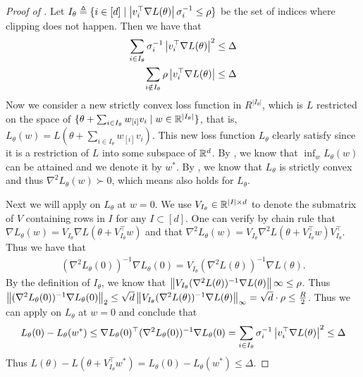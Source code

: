 \begin{proof}[Proof of ]
	Let $I_\theta\triangleq \{i\in[d]\mid \left| v_i^\top \nabla L(\theta) \right|\sigma_i^{-1} \le \rho \}$ be the set of indices where clipping does not happen. Then we have that 
	\begin{align}
		\sum_{i\in I_\theta}  \sigma_i^{-1}\left| v_i^\top \nabla L(\theta) \right|^2\le \Delta\\
		\sum_{i\notin I_\theta}  \rho \left| v_i^\top \nabla L(\theta) \right|\le \Delta
	\end{align}
Now we consider a new strictly convex loss function in $R^{|I_\theta|}$, which is $L$ restricted on the space of $\{\theta + \sum_{i\in I_\theta} w_{[i]}v_i\mid w\in\mathbb{R}^{|I_\theta|}\}$, that is, $ L_\theta(w) = L(\theta+ \sum_{i\in I_\theta}w_{[i]}v_i)$. This new loss function ${L_\theta}$ clearly satisfy  since it is a restriction of $L$ into some subspace of $\mathbb{R}^d$. By  , we know that $\inf_w L_\theta(w)$ can be attained and we denote it by $w^*$. By , we know that $L_\theta$ is strictly convex and thus $\nabla^2 L_\theta(w)\succ 0$, which means  also holds for $L_\theta$. 

Next we will apply  on $L_\theta$ at $w=0$. We  use $V_{I_\theta}\in\mathbb{R}^{|I|\times d}$ to denote the submatrix of $V$ containing rows in $I$ for any $I\subset [d]$. One can verify by chain rule that $\nabla L_\theta(w) = V_{I_\theta} \nabla L(\theta + V_{I_\theta}^\top w)$ and that $\nabla^2 L_\theta(w) = V_{I_\theta} \nabla^2 L(\theta + V_{I_\theta}^\top w) V_{I_\theta}^\top$. Thus we have that 
\begin{align}
(\nabla^2 L_\theta(0)	)^{-1}\nabla L_\theta(0) = V_{I_\theta}(\nabla^2L(\theta))^{-1}\nabla L(\theta).
\end{align}
By the definition of $I_\theta$, we know that $\left\|V_{I_\theta}(\nabla^2L(\theta))^{-1}\nabla L(\theta)\right\|\infty\le \rho$.  Thus $\left\|(\nabla^2 L_\theta(0)	)^{-1}\nabla L_\theta(0)\right\|_2 \le \sqrt{d} \left\|V_{I_\theta}(\nabla^2L(\theta))^{-1}\nabla L(\theta)\right\|_\infty = \sqrt{d}\cdot \rho \le \frac{R}{2}$. Thus we can apply  on $L_\theta$ at $w=0$ and conclude that 
\begin{align}\label{eq:intermediate_loss_approx}
	L_\theta(0)-  L_\theta(w^*) 
	\le \nabla L_\theta(0)^\top (\nabla^2 L_\theta(0))^{-1}\nabla L_\theta(0)
	=  \sum_{i\in I_\theta}  \sigma_i^{-1}\left| v_i^\top \nabla L(\theta) \right|^2
	\le  \Delta 
\end{align}
Thus $L(\theta) - L(\theta+ V_{I_\theta}^\top w^*)   = L_\theta(0)- L_\theta(w^*)\le \Delta $.


\end{proof}
